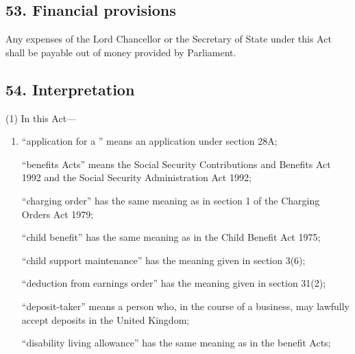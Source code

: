 \documentclass[a4paper]{article}
\begin{document}
\subsection{53. Financial provisions}

Any expenses of the Lord Chancellor or the Secretary of State under this Act shall be payable out of money provided by Parliament.

\subsection{54. Interpretation}

(1) In this Act---
\begin{enumerate}\item[]

“application for a ” means an application under section 28A;


“benefits Acts” means the Social Security Contributions and Benefits Act
1992 and the Social Security Administration Act 1992;

“charging order” has the same meaning as in section 1 of the Charging Orders Act 1979;

“child benefit” has the same meaning as in the Child Benefit Act 1975;

“child support maintenance” has the meaning given in section 3(6);


“deduction from earnings order” has the meaning given in section 31(2);



“deposit-taker” means a person who, in the course of a business, may lawfully accept deposits in the United Kingdom;

“disability living allowance” has the same meaning as in the benefit Acts;


\end{enumerate}
\end{document}

